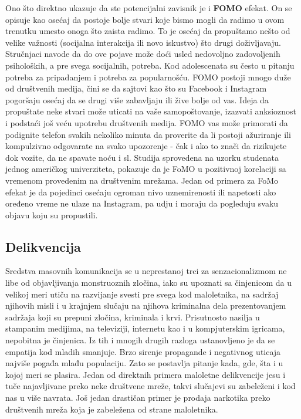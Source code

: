 \documentclass[a4paper]{article}
\begin{document}
{		Ono što direktno ukazuje da ste potencijalni zavisnik je i \textbf{FOMO} efekat. On se opisuje kao osećaj da postoje bolje stvari koje bismo mogli da radimo u ovom trenutku umesto onoga što zaista radimo. To je osećaj da propuštamo nešto od velike važnosti (socijalna interakcija ili novo iskustvo) što drugi doživljavaju. Stručnjaci navode da do ove pojave može doći usled nedovoljno zadovoljenih psiholoških, a pre svega socijalnih, potreba. Kod adolescenata su često u pitanju potreba za pripadanjem i potreba za popularnošću. FOMO postoji mnogo duže od društvenih medija, čini se da sajtovi kao što su Facebook i Instagram pogoršaju osećaj da se drugi više zabavljaju ili žive bolje od vas. Ideja da propuštate neke stvari može uticati na vaše samopoštovanje, izazvati anksioznost i podstaći još veću upotrebu društvenih medija. FOMO vas može primorati da podignite telefon svakih nekoliko minuta da proverite da li postoji ažuriranje ili kompulzivno odgovarate na svako upozorenje - čak i ako to znači da rizikujete dok vozite, da ne spavate noću i sl. Studija sprovedena na uzorku studenata jednog američkog univerziteta, pokazuje da je FoMO u pozitivnoj korelaciji sa vremenom provedenim na društvenim mrežama. Jedan od primera za FoMo efekat je da pojedinci osećaju ogroman nivo uznemirenosti  ili napetosti ako oređeno vreme ne ulaze na Instagram, pa udju i moraju da pogleduju svaku objavu koju su propustili.
		
		\subsection{Delikvencija}
		
		Sredstva masovnih komunikacija se u neprestanoj trci za senzacionalizmom ne
		libe od objavljivanja monstruoznih zločina, iako su upoznati sa činjenicom da u velikoj meri utiču na razvijanje svesti pre svega kod maloletnika, na sadržaj njihovih misli i u krajnjem slučaju na njihova kriminalna dela prezentovanjem sadržaja koji su prepuni zločina, kriminala i krvi. Prisutnosto nasilja u stampanim medijima, na televiziji, internetu kao i u kompjuterskim igricama, nepobitna je činjenica. Iz tih i mnogih drugih razloga ustanovljeno je da se empatija kod mladih smanjuje. Brzo sirenje propagande i negativnog uticaja najviše pogađa mlađu populaciju. Zato se postavlja pitanje kada, gde, šta i u kojoj meri se plasira. Jedan od direktnih primera maloletne delikvencije jesu i tuče najavljivane preko neke društvene mreže, takvi slučajevi su zabeleženi i kod nas u više navrata. Još jedan drastičan primer je prodaja narkotika preko društvenih mreža koja je zabeležena od strane maloletnika.
		
}
\end{document}

